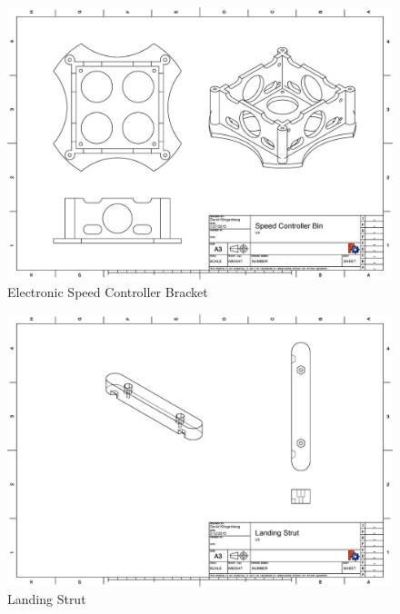 \documentclass[pdftex,11pt]{article}
\begin{document}
\begin{figure}[!h]
	\centering
		\includegraphics[width=1\textwidth]{./graphics/Speed_controler_bin.eps}
	\caption{Electronic Speed Controller Bracket}
	\label{fig:partbin}
\end{figure}

\begin{figure}[!h]
	\centering
		\includegraphics[width=1\textwidth]{./graphics/Landing_strut.eps}
	\caption{Landing Strut}
	\label{fig:landingStrut}
\end{figure}
\end{document}
